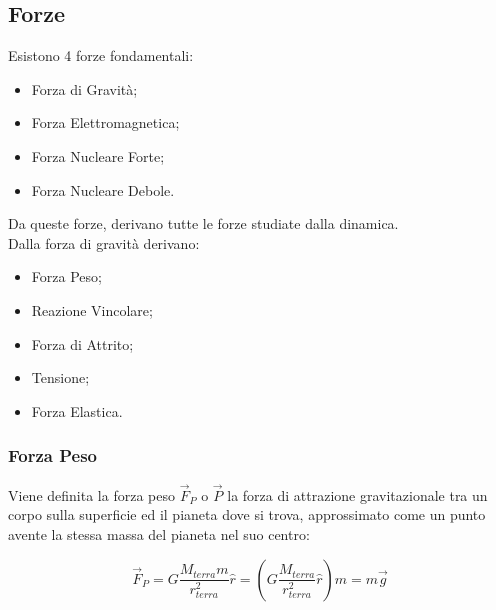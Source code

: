 \documentclass{article}
\numberwithin{equation}{subsection}
\begin{document}
\subsection{Forze}

Esistono 4 forze fondamentali:
\begin{itemize}
    \item Forza di Gravità;
    \item Forza Elettromagnetica;
    \item Forza Nucleare Forte;
    \item Forza Nucleare Debole.
\end{itemize}
Da queste forze, derivano tutte le forze studiate dalla 
dinamica.\\
Dalla forza di gravità derivano:

\begin{itemize}
    \item Forza Peso;
    \item Reazione Vincolare;
    \item Forza di Attrito;
    \item Tensione;
    \item Forza Elastica.
\end{itemize}


\subsubsection{Forza Peso}

Viene definita la forza peso $\vec{F}_P$ o $\vec{P}$ la forza di attrazione gravitazionale tra un
corpo sulla superficie ed il pianeta dove si trova, approssimato 
come un punto avente la stessa massa del pianeta nel suo centro:

\begin{equation}
    \vec{F}_P=G\displaystyle\frac{M_{terra}m}{r_{terra}^{2}}\hat{r}=\left(G\frac{M_{terra}}{r_{terra}^{2}}\hat{r}\right)m=m\vec{g}
\end{equation}
\end{document}
